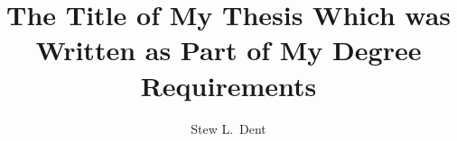 \documentclass{urithesis}
\begin{document}
\title{The Title of My Thesis Which was Written
       as Part of My Degree Requirements}

\author{Stew L.~Dent}





\nocite{re:toolan:as03}
\end{document}
